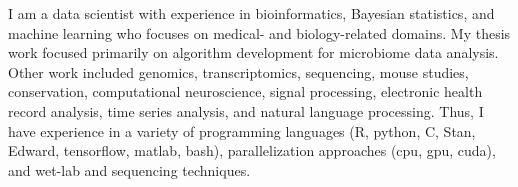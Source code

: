 

\begin{cvparagraph}

I am a data scientist with experience in bioinformatics, Bayesian statistics, and machine learning who focuses on medical- and biology-related domains. My thesis work focused primarily on algorithm development for microbiome data analysis. Other work included genomics, transcriptomics, sequencing, mouse studies, conservation, computational neuroscience, signal processing, electronic health record analysis, time series analysis, and natural language processing. Thus, I have experience in a variety of programming languages (R, python, C, Stan, Edward, tensorflow, matlab, bash), parallelization approaches (cpu, gpu, cuda), and wet-lab and sequencing techniques.
\end{cvparagraph}

